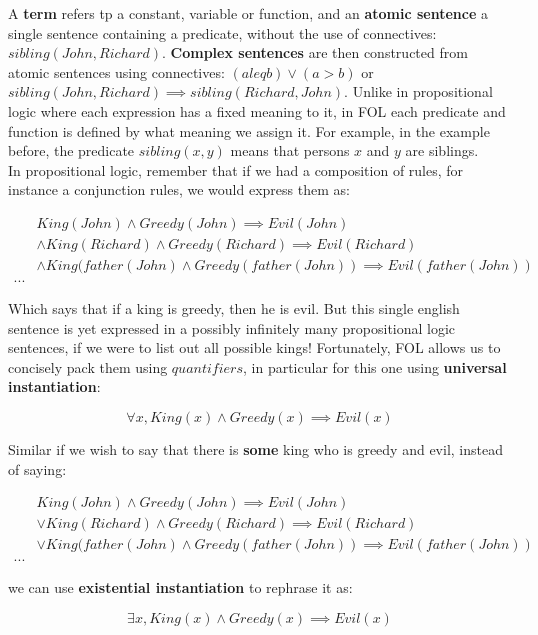 \documentclass[12pt]{article}
\begin{document}
A \textbf{term} refers tp a constant, variable or function, and an\textbf{ atomic sentence} a single sentence containing a predicate, without the use of connectives: $sibling(John, Richard)$. \textbf{Complex sentences} are then constructed from atomic sentences using connectives: $(a leq b) \lor (a > b)$ or $sibling(John, Richard) \implies sibling(Richard, John)$. Unlike in propositional logic where each expression has a fixed meaning to it, in FOL each predicate and function is defined by what meaning we assign it. For example, in the example before, the predicate $sibling(x, y)$ means that persons $x$ and $y$ are siblings.\\

In propositional logic, remember that if we had a composition of rules, for instance a conjunction rules, we would express them as:

\begin{equation*}
\begin{aligned}
&King(John) \land Greedy(John) \implies Evil(John)\\
&\land King(Richard) \land Greedy(Richard) \implies Evil(Richard)\\
&\land King(father(John) \land Greedy(father(John)) \implies Evil(father(John))\\
...
\end{aligned}
\end{equation*}

Which says that if a king is greedy, then he is evil. But this single english sentence is yet expressed in a possibly infinitely many propositional logic sentences, if we were to list out all possible kings! Fortunately, FOL allows us to concisely pack them using $quantifiers$, in particular for this one using \textbf{universal instantiation}:

\begin{equation*}
\forall x, King(x) \land Greedy(x) \implies Evil(x)
\end{equation*}

Similar if we wish to say that there is \textbf{some} king who is greedy and evil, instead of saying:

\begin{equation*}
\begin{aligned}
&King(John) \land Greedy(John) \implies Evil(John)\\
&\lor King(Richard) \land Greedy(Richard) \implies Evil(Richard)\\
&\lor King(father(John) \land Greedy(father(John)) \implies Evil(father(John))\\
...
\end{aligned}
\end{equation*}

we can use \textbf{existential instantiation} to rephrase it as:

\begin{equation*}
\exists x, King(x) \land Greedy(x) \implies Evil(x)
\end{equation*}
\end{document}
